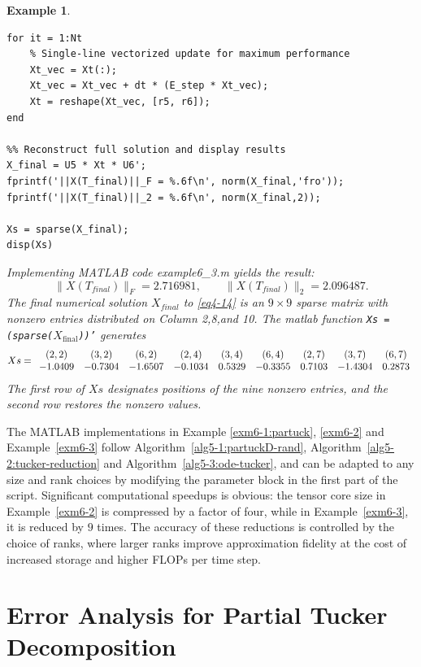 \documentclass[11pt, oneside]{article}  %
\newtheorem{exm}[thm]{Example}
\newcommand{\norm}[1]{\parallel\! #1\! \parallel}
\begin{document}
\begin{exm}
\begin{verbatim}
for it = 1:Nt
    % Single-line vectorized update for maximum performance
    Xt_vec = Xt(:);
    Xt_vec = Xt_vec + dt * (E_step * Xt_vec);
    Xt = reshape(Xt_vec, [r5, r6]);
end

%% Reconstruct full solution and display results
X_final = U5 * Xt * U6';
fprintf('||X(T_final)||_F = %.6f\n', norm(X_final,'fro'));
fprintf('||X(T_final)||_2 = %.6f\n', norm(X_final,2)); 

Xs = sparse(X_final);  
disp(Xs)
\end{verbatim}

Implementing MATLAB code example6\_3.m yields the result: 
\[ \norm{X(T_{final})}_F = 2.716981, \qquad  \norm{X(T_{final})}_2 = 2.096487. \]
The final numerical solution $X_{final}$ to \eqref{eq4-14} is an $9\times 9$ sparse matrix with nonzero entries distributed on Column 2,8,and 10. 
The matlab function \texttt{Xs = (sparse($X_{\text{final}}$))'} generates 
\[ 
Xs= 
\begin{array}{c c c c c c c c c} 
   (2,2)     & (3,2)       & (6,2)    & (2,4)    & (3,4)     &  (6,4)   &(2,7)   & (3,7)    &  (6,7) \\
   -1.0409& -0.7304  &-1.6507 &-0.1034 & 0.5329 &-0.3355&0.7103&-1.4304&0.2873
\end{array}  
\]
The first row of $Xs$ designates positions of the nine nonzero entries, and the second row restores the nonzero values.  
\end{exm}       
     
The MATLAB implementations in Example \ref{exm6-1:partuck}, \ref{exm6-2} and Example~\ref{exm6-3} follow Algorithm~\ref{alg5-1:partuckD-rand}, Algorithm~\ref{alg5-2:tucker-reduction} and Algorithm~\ref{alg5-3:ode-tucker}, and can be adapted to 
any size and rank choices by modifying the parameter block in the first part of the script. Significant computational speedups is obvious:  the tensor core size in Example~\ref{exm6-2} is compressed by a factor of four, 
while in Example~\ref{exm6-3}, it is reduced by $9$ times. The accuracy of these reductions is controlled by the choice of ranks, where larger 
ranks improve approximation fidelity at the cost of increased storage and higher FLOPs per time step.  


\section{Error Analysis for Partial Tucker Decomposition}
\label{sec7}
\setcounter{equation}{0}
\end{document}

